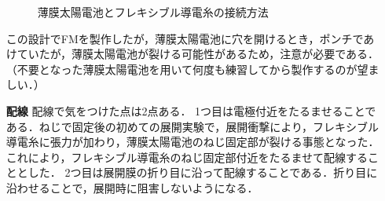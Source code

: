 \begin{itemize}
\begin{figure}[H]
		\caption{薄膜太陽電池とフレキシブル導電糸の接続方法}
		\label{fig3-9-3-2}
	\end{figure}
	この設計でFMを製作したが，薄膜太陽電池に穴を開けるとき，ポンチであけていたが，薄膜太陽電池が裂ける可能性があるため，注意が必要である．（不要となった薄膜太陽電池を用いて何度も練習してから製作するのが望ましい．）\\
	\item [\textbf{配線}]
	配線で気をつけた点は2点ある．
	1つ目は電極付近をたるませることである．ねじで固定後の初めての展開実験で，展開衝撃により，フレキシブル導電糸に張力が加わり，薄膜太陽電池のねじ固定部が裂ける事態となった．これにより，フレキシブル導電糸のねじ固定部付近をたるませて配線することとした．
	2つ目は展開膜の折り目に沿って配線することである．折り目に沿わせることで，展開時に阻害しないようになる．
\end{itemize}


